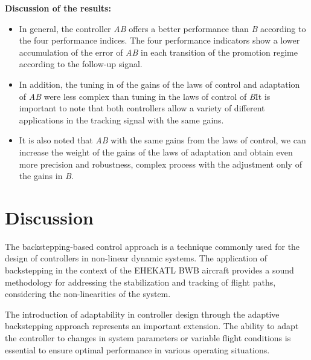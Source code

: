 \bigskip

\textbf{Discussion of the results:}
\begin{itemize}
    \item In general, the controller \textit{AB} offers a better performance than \textit{B} according to the four performance indices. 
    The four performance indicators show a lower accumulation of the error of \textit{AB} in each transition of the promotion regime according to the follow-up signal.
    \item In addition, the tuning in of the gains of the laws of control and adaptation of \textit{AB} were less complex than tuning in the laws of control of \textit{B}It is important to note that both controllers allow a variety of different applications in the tracking signal with the same gains. 
    \item It is also noted that \textit{AB} with the same gains from the laws of control, we can increase the weight of the gains of the laws of adaptation and obtain even more precision and robustness, complex process with the adjustment only of the gains in \textit{B}.
\end{itemize}

\section{Discussion}

The backstepping-based control approach is a technique commonly used for the design of controllers in non-linear dynamic systems. The application of backstepping in the context of the EHEKATL BWB aircraft provides a sound methodology for addressing the stabilization and tracking of flight paths, considering the non-linearities of the system.

The introduction of adaptability in controller design through the adaptive backstepping approach represents an important extension. The ability to adapt the controller to changes in system parameters or variable flight conditions is essential to ensure optimal performance in various operating situations.

